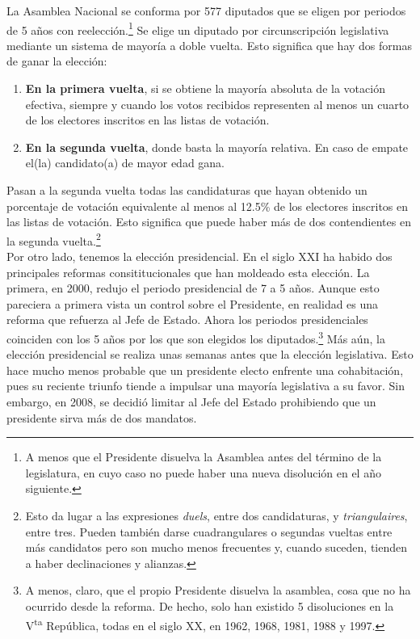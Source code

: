 La Asamblea Nacional se conforma por 577 diputados que se eligen por periodos de 5 años con reelección.\footnote{A menos que el Presidente disuelva la Asamblea antes del término de la legislatura, en cuyo caso no puede haber una nueva disolución en el año siguiente.} Se elige un diputado por circunscripción legislativa mediante un sistema de mayoría a doble vuelta. Esto significa que hay dos formas de ganar la elección: 

\begin{enumerate}
\item \textbf{En la primera vuelta}, si se obtiene la mayoría absoluta de la votación efectiva, siempre y cuando los votos recibidos representen al menos un cuarto de los electores inscritos en las listas de votación. 
\item \textbf{En la segunda vuelta}, donde basta la mayoría relativa. En caso de empate el(la) candidato(a) de mayor edad gana. 
\end{enumerate}

Pasan a la segunda vuelta todas las candidaturas que hayan obtenido un porcentaje de votación equivalente al menos al 12.5\% de los electores inscritos en las listas de votación. Esto significa que puede haber más de dos contendientes en la segunda vuelta.\footnote{Esto da lugar a las expresiones \textit{duels}, entre dos candidaturas, y \textit{triangulaires}, entre tres. Pueden también darse cuadrangulares o segundas vueltas entre más candidatos pero son mucho menos frecuentes y, cuando suceden, tienden a haber declinaciones y alianzas.}\\

Por otro lado, tenemos la elección presidencial. En el siglo XXI ha habido dos principales reformas consititucionales que han moldeado esta elección. La primera, en 2000, redujo el periodo presidencial de 7 a 5 años. Aunque esto pareciera a primera vista un control sobre el Presidente, en realidad es una reforma que refuerza al Jefe de Estado. Ahora los periodos presidenciales coinciden con los 5 años por los que son elegidos los diputados.\footnote{A menos, claro, que el propio Presidente disuelva la asamblea, cosa que no ha ocurrido desde la reforma. De hecho, solo han existido 5 disoluciones en la V\textsuperscript{ta} República, todas en el siglo XX, en 1962, 1968, 1981, 1988 y 1997.} Más aún, la elección presidencial se realiza unas semanas antes que la elección legislativa. Esto hace mucho menos probable que un presidente electo enfrente una cohabitación, pues su reciente triunfo tiende a impulsar una mayoría legislativa a su favor. Sin embargo, en 2008, se decidió limitar al Jefe del Estado prohibiendo que un presidente sirva más de dos mandatos.\\

